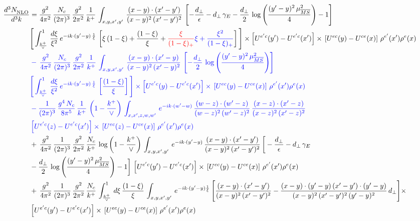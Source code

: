 \documentclass[10pt]{article}
\numberwithin{equation}{section}
\newcommand{\new}[1]{{\color{blue}#1}}
\newcommand{\old}[1]{{\color{red}#1}}
\newcommand{\nc}{\color{blue}}
\begin{document}
\begin{align}
    \frac{d^{3}N_{\rm NLO}^{\rm}}{d^{3}k}  & =  \frac{g^{2}}{4\pi^{2}}\, \frac{N_{c}}{(2\pi)^{3}}\,\frac{g^{2}}{2\pi^{2}}\, \frac{1}{k^{+}}\,\int_{x,y,x',y'}\,\frac{(x-y)\cdot (x'-y')}{(x-y)^{2}\,(x'-y')^{2}}\,\left[-\frac{d_{\perp}}{\epsilon}-d_{\perp}\,\gamma_{E}-\frac{d_{\perp}}{2}\,\log{\left(\frac{(y'-y)^{2}\,\mu^{2}_{\overline{MS}}}{4}\right)}-1\right]\,\notag \\ & \Bigg[\int_{\frac{k^{+}}{\vee}}^{1}\,\frac{d\xi}{\xi^{2}}\,e^{-ik\cdot (y'-y)\,\frac{1}{\xi}}\,\left[\xi\,(1-\xi)+\frac{(1-\xi)}{\xi}+\old{\frac{\xi}{(1-\xi)_{+}}}\new{\xi+\frac{\xi^{2}}{(1-\xi)_{+}}}\right]\Bigg]\times \left[U^{e'c}(y') - U^{e'c}(x')\right] \times\, \left[U^{ec}(y) - U^{ce}(x)\right]\, \rho^{e'}(x') \rho^{e}(x) \notag \\
& \nc  -\,\frac{g^{2}}{4\pi^{2}}\, \frac{N_{c}}{(2\pi)^{3}}\,\frac{g^{2}}{2\pi^{2}}\, \frac{1}{k^{+}}\,\int_{x,y,x',y'}\,\frac{(x-y)\cdot (x'-y)}{(x-y)^{2}\,(x'-y)^{2}}\,\left[-\frac{d_{\perp}}{2}\,\log{\left(\frac{(y'-y)^{2}\,\mu^{2}_{\overline{MS}}}{4}\right)}\right]\,\notag \\ & \nc  \Bigg[\int_{\frac{k^{+}}{\vee}}^{1}\,\frac{d\xi}{\xi^{2}}\,e^{-ik\cdot (y'-y)\,\frac{1}{\xi}}\,\left[\frac{(1-\xi)}{\xi}\right]\Bigg]\times \left[U^{e'c}(y) - U^{e'c}(x')\right] \times\, \left[U^{ec}(y) - U^{ce}(x)\right]\, \rho^{e'}(x') \rho^{e}(x) \notag \\
& \nc  -\frac{1}{(2\pi)^{3}}\,\frac{g^{4}\,N_{c}}{8\pi^{5}}\,\frac{1}{k^{+}}\,\left(1-\frac{k^{+}}{\vee}\right)\,\int_{x,x',z,w,w'}\,e^{-ik\cdot (w'-w)}\,\frac{(w-z)\cdot(w'-z)}{(w-z)^{2}\,(w'-z)^{2}}\,\frac{(x-z)\cdot(x'-z)}{(x-z)^{2}\,(x'-z)^{2}}\notag \\
& \nc  \left[U^{e'c}(z) - U^{e'c}(x')\right] \times\, \left[U^{ec}(z) - U^{ce}(x)\right]\, \rho^{e'}(x') \rho^{e}(x) \notag \\
&  +\, \frac{g^{2}}{4\pi^{2}}\, \frac{1}{(2\pi)^{3}}\,\frac{g^{2}}{2\pi^{2}}\, \frac{N_{c}}{k^{+}}\,\log{\left(1-\frac{k^{+}}{\vee}\right)}\,\int_{x,y,x',y'}\,e^{-ik\cdot (y'-y)}\,\frac{(x-y)\cdot (x'-y')}{(x-y)^{2}\,(x'-y')^{2}}\,\bigg[-\frac{d_{\perp}}{\epsilon}-d_{\perp}\,\gamma_{E}\notag \\ & -\frac{d_{\perp}}{2}\,\log{\left(\frac{(y'-y)^{2}\,\mu^{2}_{\overline{MS}}}{4}\right)}-1\bigg]\,\left[U^{e'c}(y') - U^{e'c}(x')\right] \times\, \left[U^{ec}(y) - U^{ce}(x)\right]\, \rho^{e'}(x') \rho^{e}(x) \notag \\
& +\,\frac{g^{2}}{4\pi^{2}}\, \frac{1}{(2\pi)^{3}}\,\frac{g^{2}}{2\pi^{2}}\, \frac{N_{c}}{k^{+}}\,\int_{\frac{k^{+}}{\vee}}^{1}\,d\xi\, \frac{(1-\xi)}{\xi}\, \int_{x,y,x',y'}\,e^{-ik\cdot (y'-y)\frac{1}{\xi}}\,\Bigg[\frac{(x-y)\cdot (x'-y')}{(x-y)^{2}\, (x'-y')^{2}} -\frac{(x-y)\cdot (y'-y)\, (x'-y')\cdot (y'-y)}{(x-y)^{2}\,(x'-y')^{2}\,(y'-y)^{2}}\,d_{\perp}\Bigg]\times\notag \\ &  \left[U^{e'c}(y') - U^{e'c}(x')\right] \times\, \left[U^{ec}(y) - U^{ce}(x)\right]\, \rho^{e'}(x') \rho^{e}(x) \label{eq:F:G2IV}
\end{align}
\end{document}
